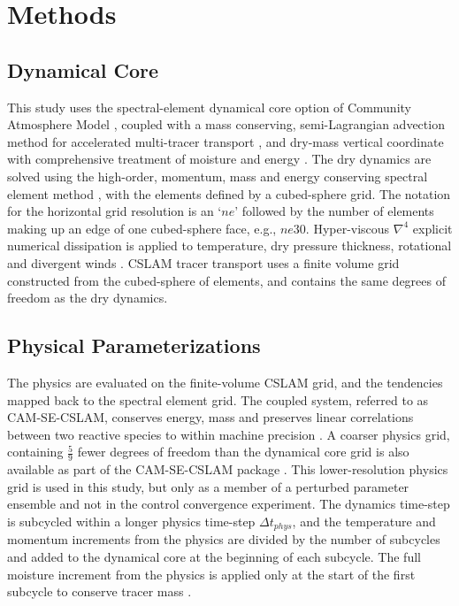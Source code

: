 \documentclass[times]{qjrms4}
\begin{document}
\section{Methods}

\subsection{Dynamical Core}

This study uses the spectral-element dynamical core option of Community Atmosphere Model \citep[CAM-SE;][]{DetAl2012IJHPCA}, coupled with a mass conserving, semi-Lagrangian advection method for accelerated multi-tracer transport \citep[CSLAM;][]{LTOUNGK2017MWR}, and dry-mass vertical coordinate with comprehensive treatment of moisture and energy \citep{LetAl2018JAMES}. The dry dynamics are solved using the high-order, momentum, mass and energy conserving spectral element method \citep{TF2010JCP}, with the elements defined by a cubed-sphere grid. The notation for the horizontal grid resolution is an `$ne$' followed by the number of elements making up an edge of one cubed-sphere face, e.g., $ne30$. Hyper-viscous $\nabla^{4}$ explicit numerical dissipation is applied to temperature, dry pressure thickness, rotational and divergent winds \citep{LetAl2018JAMES}. CSLAM tracer transport uses a finite volume grid constructed from the cubed-sphere of elements, and contains the same degrees of freedom as the dry dynamics.

\subsection{Physical Parameterizations}

The physics are evaluated on the finite-volume CSLAM grid, and the tendencies mapped back to the spectral element grid. The coupled system, referred to as CAM-SE-CSLAM, conserves energy, mass and preserves linear correlations between two reactive species to within machine precision \citep{HL2018MWR}. A coarser physics grid, containing $\frac{5}{9}$ fewer degrees of freedom than the dynamical core grid is also available as part of the CAM-SE-CSLAM package \citep{HETAL2019JAMES}. This lower-resolution physics grid is used in this study, but only as a member of a perturbed parameter ensemble and not in the control convergence experiment. The dynamics time-step is subcycled within a longer physics time-step $\Delta t_{phys}$, and the temperature and momentum increments from the physics are divided by the number of subcycles and added to the dynamical core at the beginning of each subcycle. The full moisture increment from the physics is applied only at the start of the first subcycle to conserve tracer mass \citep[$ftype=2$ option in][]{LW2019JAMES}.
\end{document}
